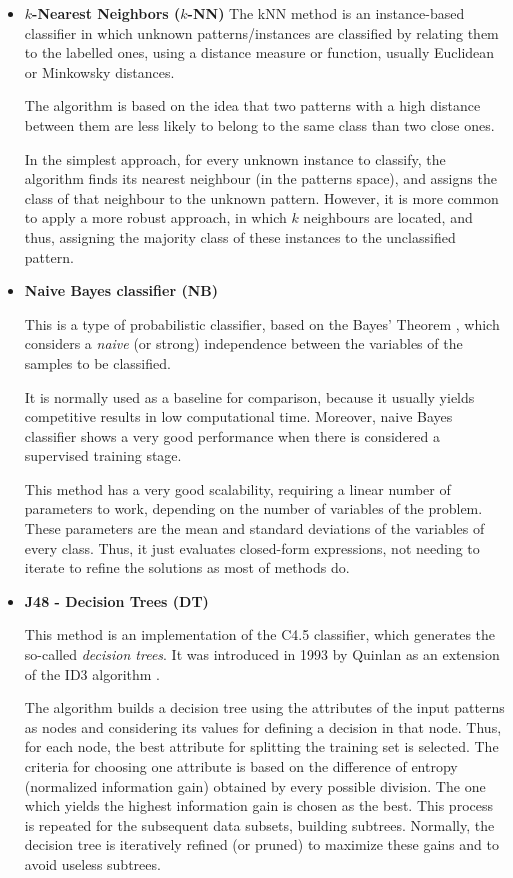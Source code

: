 \documentclass[a4paper,10pt,onecolumn,preprint,3p]{elsarticle}
\begin{document}
\begin{itemize}

\item \textbf{$k$-Nearest Neighbors ($k$-NN)}
The kNN \cite{Aha1991,Mitchell1997} method is an instance-based classifier in 
which unknown patterns/instances are classified by relating them to the labelled ones, using a distance measure or function, usually Euclidean or Minkowsky distances.

The algorithm is based on the idea that two patterns with a high distance between them are less likely to belong to the same class than two close ones.

In the simplest approach, for every unknown instance to classify, the algorithm finds its nearest neighbour (in the patterns space), and assigns the class of that neighbour to the unknown pattern.
However, it is more common to apply a more robust approach, in which $k$ neighbours are located, and thus, assigning the majority class of these instances to the unclassified pattern.

\item \textbf{Naive Bayes classifier (NB)}

This is a type of probabilistic classifier, based on the Bayes' Theorem \cite{AI-book_Bayes}, which considers a \textit{naive} (or strong) independence between the variables of the samples to be classified.

It is normally used as a baseline for comparison, because it usually yields competitive results in low computational time. Moreover, naive Bayes classifier shows a very good performance when there is considered a supervised training stage.

This method has a very good scalability, requiring a linear number of parameters to work, depending on the number of variables of the problem. These parameters are the mean and standard deviations of the variables of every class.
Thus, it just evaluates closed-form expressions, not needing to iterate to refine the solutions as most of methods do.


\item \textbf{J48 - Decision Trees (DT)}

This method is an implementation of the C4.5 classifier, which generates the so-called \textit{decision trees}. It was introduced in 1993 by Quinlan \cite{Quinlan1993} as an extension of the ID3 algorithm \cite{Mitchell1997}. 

The algorithm builds a decision tree using the attributes of the input patterns as nodes and considering its values for defining a decision in that node. Thus, for each node, the best attribute for splitting the training set is selected. The criteria for choosing one attribute is based on the difference of entropy (normalized information gain) obtained by every possible division. The one which yields the highest information gain is chosen as the best. This process is repeated for the subsequent data subsets, building subtrees. Normally, the decision tree is iteratively refined (or pruned) to maximize these gains and to avoid useless subtrees.



\end{itemize}
\end{document}
